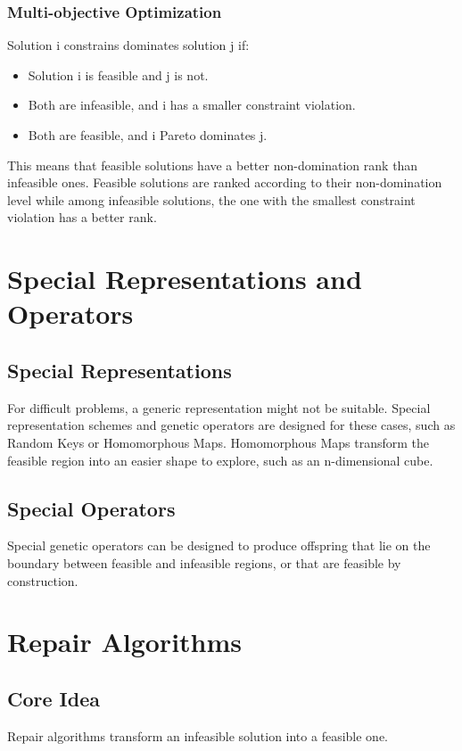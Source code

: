 \subsubsection*{Multi-objective Optimization}
Solution i constrains dominates solution j if:
\begin{itemize}
    \item Solution i is feasible and j is not.
    \item Both are infeasible, and i has a smaller constraint violation.
    \item Both are feasible, and i Pareto dominates j.
\end{itemize}
This means that feasible solutions have a better non-domination rank than infeasible ones. Feasible solutions are ranked according to their non-domination level while among infeasible solutions, the one with the smallest constraint violation has a better rank.

\section{Special Representations and Operators}

\subsection*{Special Representations}
For difficult problems, a generic representation might not be suitable. Special representation schemes and genetic operators are designed for these cases, such as Random Keys or Homomorphous Maps. Homomorphous Maps transform the feasible region into an easier shape to explore, such as an n-dimensional cube.

\subsection*{Special Operators}
Special genetic operators can be designed to produce offspring that lie on the boundary between feasible and infeasible regions, or that are feasible by construction.

\section{Repair Algorithms}

\subsection*{Core Idea}
Repair algorithms transform an infeasible solution into a feasible one.

